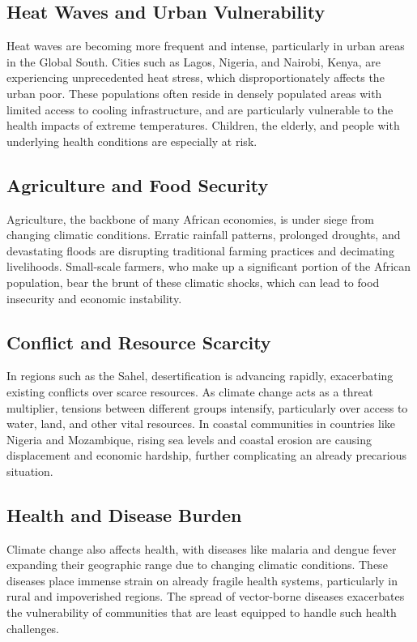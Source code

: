 \documentclass[12pt]{article}
\begin{document}
\subsection{Heat Waves and Urban Vulnerability}

Heat waves are becoming more frequent and intense, particularly in urban areas in the Global South. Cities such as Lagos, Nigeria, and Nairobi, Kenya, are experiencing unprecedented heat stress, which disproportionately affects the urban poor. These populations often reside in densely populated areas with limited access to cooling infrastructure, and are particularly vulnerable to the health impacts of extreme temperatures. Children, the elderly, and people with underlying health conditions are especially at risk.

\subsection{Agriculture and Food Security}

Agriculture, the backbone of many African economies, is under siege from changing climatic conditions. Erratic rainfall patterns, prolonged droughts, and devastating floods are disrupting traditional farming practices and decimating livelihoods. Small-scale farmers, who make up a significant portion of the African population, bear the brunt of these climatic shocks, which can lead to food insecurity and economic instability.

\subsection{Conflict and Resource Scarcity}

In regions such as the Sahel, desertification is advancing rapidly, exacerbating existing conflicts over scarce resources. As climate change acts as a threat multiplier, tensions between different groups intensify, particularly over access to water, land, and other vital resources. In coastal communities in countries like Nigeria and Mozambique, rising sea levels and coastal erosion are causing displacement and economic hardship, further complicating an already precarious situation.

\subsection{Health and Disease Burden}

Climate change also affects health, with diseases like malaria and dengue fever expanding their geographic range due to changing climatic conditions. These diseases place immense strain on already fragile health systems, particularly in rural and impoverished regions. The spread of vector-borne diseases exacerbates the vulnerability of communities that are least equipped to handle such health challenges.
\end{document}
